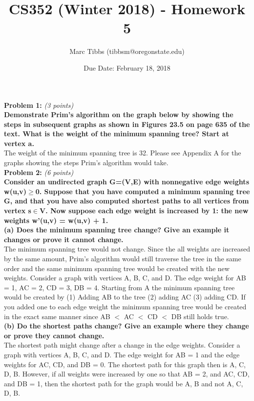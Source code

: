\documentclass{article}
\title{CS352 (Winter 2018) - Homework 5}
\author{Marc Tibbs (tibbsm@oregonstate.edu)}
\date{Due Date: February 18, 2018}
\begin{document}
\maketitle

\noindent \textbf{Problem 1:} \textit{(3 points)} \\

\noindent \textbf{Demonstrate Prim's algorithm on the graph below by showing the steps in subsequent graphs as shown in Figures 23.5 on page 635 of the text. What is the weight of the minimum spanning tree? Start at vertex a.}
\\[.25cm]

\noindent The weight of the minimum spanning tree is 32. Please see Appendix A for the graphs showing the steps Prim's algorithm would take.
\\[.25cm]

\noindent \textbf{Problem 2:} \textit{(6 points)} \\

\noindent \textbf{Consider an undirected graph G=(V,E) with nonnegative edge weights w(u,v)$\geq$0. Suppose that you have computed a minimum spanning tree G, and that you have also computed shortest paths to all vertices from vertex s$\in$V. Now suppose each edge weight is increased by 1: the new weights w'(u,v) = w(u,v) + 1.}
\\[.25cm]

\noindent \textbf{(a) Does the minimum spanning tree change? Give an example it changes or prove it cannot change.}
\\[.25cm]
The minimum spanning tree would not change. Since the all weights are increased by the same amount, Prim's algorithm would still traverse the tree in the same order and the same minimum spanning tree would be created with the new weights. Consider a graph with vertices A, B, C, and D. The edge weight for AB = 1, AC = 2, CD = 3, DB = 4. Starting from A the minimum spanning tree would be created by (1) Adding AB to the tree (2) adding AC (3) adding CD. If you added one to each edge weight the minimum spanning tree would be created in the exact same manner since AB $<$ AC $<$ CD $<$ DB still holds true. 
\\[.25cm]

\noindent \textbf{(b) Do the shortest paths change? Give an example where they change or prove they cannot change.}
\\[.25cm]
The shortest path might change after a change in the edge weights. Consider a graph with vertices A, B, C, and D. The edge weight for AB = 1 and the edge weights for AC, CD, and DB = 0. The shortest path for this graph then is A, C, D, B. However, if all weights were increased by one so that AB = 2, and AC, CD, and DB = 1, then the shortest path for the graph would be A, B and not A, C, D, B. 
\\[.25cm]
\\
\end{document}
